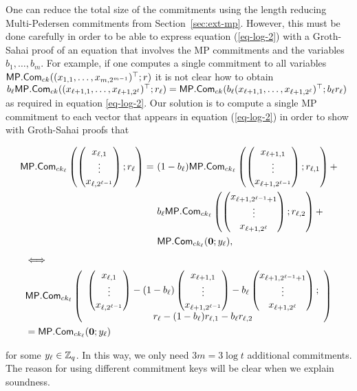 One can reduce the total size of the commitments using the length reducing Multi-Pedersen commitments from Section~\ref{sec:ext-mp}. However, this must be done carefully in order to be able to express equation (\ref{eq-log-2}) with a Groth-Sahai proof of an equation that involves the MP commitments and the variables $b_1,\ldots,b_m$. For example, if one computes a single commitment to all variables $\mathsf{MP}.\mathsf{Com}_{ck}((x_{1,1},\ldots,x_{m,2^{m-1}})^\top;r)$ it is not clear how to obtain $b_\ell\mathsf{MP}.\mathsf{Com}_{ck}(\allowbreak (x_{\ell+1,1},\ldots,x_{\ell+1,2^\ell})^\top\allowbreak ;r_\ell)=\mathsf{MP}.\mathsf{Com}_{ck}(b_\ell(x_{\ell+1,1},\ldots,x_{\ell+1,2^\ell})^\top;b_\ell r_\ell)$ as required in equation \ref{eq-log-2}. Our solution is to compute a single MP commitment to each vector that appears in equation (\ref{eq-log-2}) in order to show with Groth-Sahai proofs that
\begin{small}
\begin{align*}
\MP.\Com_{ck_\ell}\left(
                    \pmatri{x_{\ell,1}\\\vdots\\x_{\ell,2^{\ell-1}}};r_\ell\right)
=\ &(1-b_\ell)\MP.\Com_{ck_\ell}\left(\pmatri{x_{\ell+1,1}\\\vdots\\x_{\ell+1,2^{\ell-1}}};r_{\ell,1}\right)+\\
& b_\ell\MP.\Com_{ck_\ell}\left(\pmatri{x_{\ell+1,2^{\ell-1}+1}\\\vdots\\x_{\ell+1,2^\ell}};r_{\ell,2}\right)+\\
& \MP.\Com_{ck_\ell}(\vecb{0};y_\ell),
\end{align*}
\begin{align*}
&\Longleftrightarrow\\
&\mathsf{MP}.\mathsf{Com}_{ck_\ell}\left(\begin{array}{c}
    \left(\begin{matrix}x_{\ell,1}\\\vdots\\x_{\ell,2^{\ell-1}}\end{matrix}\right)
    -(1-b_\ell)\left(\begin{matrix}x_{\ell+1,1}\\\vdots\\x_{\ell+1,2^{\ell-1}}\end{matrix}\right)
    -b_\ell\left(\begin{matrix}x_{\ell+1,2^{\ell-1}+1}\\\vdots\\x_{\ell+1,2^\ell}\end{matrix}\right);\\
    r_\ell-(1-b_\ell)r_{\ell,1}-b_\ell r_{\ell,2}
\end{array}\right)\\
&=
\mathsf{MP}.\mathsf{Com}_{ck_\ell}(\mathbf{0};y_\ell)
\end{align*}\end{small}
for some $y_\ell\in\mathbb{Z}_q$. In this way, we only need $3m=3\log t$ additional commitments. The reason for using different commitment keys will be clear when we explain soundness.

